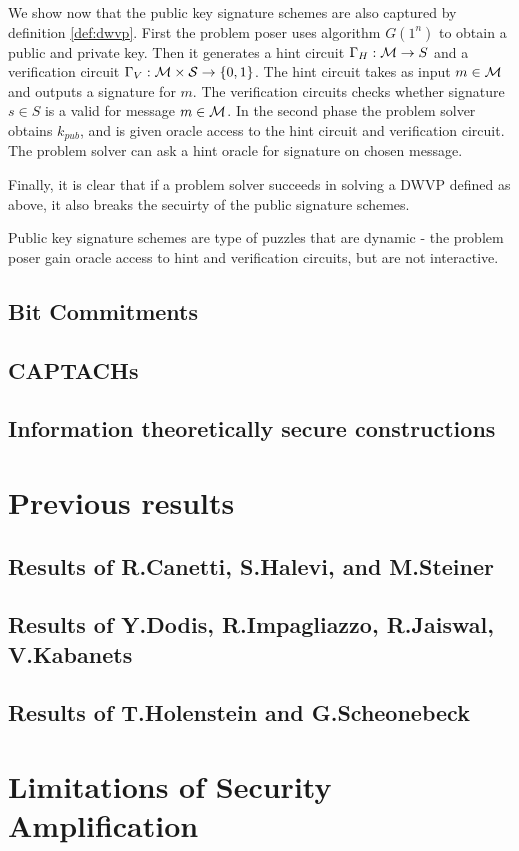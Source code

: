 \documentclass[11pt,a4paper,titlepage]{memoir}
\begin{document}
We show now that the public key signature schemes are also captured by definition \ref{def:dwvp}.
First the problem poser uses algorithm $G(1^n)$ to obtain a public and private key.
Then it generates a hint circuit $\Gamma_H : \mathcal{M} \rightarrow S$ and a verification circuit $\Gamma_V : \mathcal{M} \times \mathcal{S} \rightarrow \{0,1\}$.
The hint circuit takes as input $m \in \mathcal{M}$ and outputs a signature for $m$. The verification circuits checks whether
signature $s \in S$ is a valid for message $m \in \mathcal{M}$.
In the second phase the problem solver obtains $k_{pub}$, and is given oracle access to the hint circuit and verification circuit.
The problem solver can ask a hint oracle for signature on chosen message.

Finally, it is clear that if a problem solver succeeds in solving a DWVP defined as above, it also breaks the secuirty of the public signature schemes.

Public key signature schemes are type of puzzles that are dynamic - the problem poser gain oracle access to hint and verification circuits,
but are not interactive.

\subsection{Bit Commitments}
\cite{LectureNotesComThCrypto}


\subsection{CAPTACHs}


\subsection{Information theoretically secure constructions}


\section{Previous results}
\label{st:previous_results}
\subsection{Results of R.Canetti, S.Halevi, and M.Steiner}
\subsection{Results of Y.Dodis, R.Impagliazzo, R.Jaiswal, V.Kabanets}
\subsection{Results of T.Holenstein and G.Scheonebeck}
\section{Limitations of Security Amplification}



\appendix


\backmatter



\end{document}
